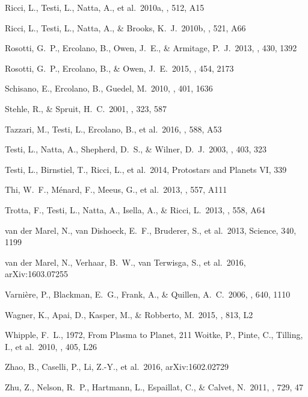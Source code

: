 \begin{thebibliography}{2000b}
 Ricci, L., Testi,
  L., Natta, A., et al.\ 2010a, \aap, 512, A15

 Ricci, L., Testi,
  L., Natta, A., \& Brooks, K.~J.\ 2010b, \aap, 521, A66 

 Rosotti, G.~P., 
Ercolano, B., Owen, J.~E., \& Armitage, P.~J.\ 2013, \mnras, 430, 1392 

 Rosotti, G.~P., Ercolano, B., \& Owen, J.~E.\ 2015, \mnras, 454, 2173

 Schisano, E., 
Ercolano, B., Guedel, M.\ 2010, \mnras, 401, 1636 

 Stehle, R., \& Spruit, H.~C.\ 2001, \mnras, 323, 587 

 Tazzari, M., Testi, L., Ercolano, B., et al.\ 2016, \aap, 588, A53 

 Testi, L., Natta,
  A., Shepherd, D.~S., \& Wilner, D.~J.\ 2003, \aap, 403, 323

 Testi, L., Birnstiel, T., 
Ricci, L., et al.\ 2014, Protostars and Planets VI, 339 

 Thi, W.~F., M{\'e}nard, F., Meeus, G., et al.\ 2013, \aap, 557, A111 

 Trotta, F., Testi, L., Natta, A., Isella, A., \& Ricci, L.\ 2013, \aap, 558, A64

 van der Marel, 
N., van Dishoeck, E.~F., Bruderer, S., et al.\ 2013, Science, 340,
1199 

 van der Marel, N., Verhaar, B.~W., van Terwisga, S., et al.\ 2016, arXiv:1603.07255

 Varni{\`e}re, P., 
Blackman, E.~G., Frank, A., \& Quillen, A.~C.\ 2006, \apj, 640, 1110 

 Wagner, K., Apai, D., Kasper, M., \& Robberto, M.\ 2015, \apjl, 813, L2

 Whipple, F.~L., 1972, From Plasma to Planet, 211
 Woitke, P., Pinte, C., 
Tilling, I., et al.\ 2010, \mnras, 405, L26 

 Zhao, B., Caselli, P., Li, Z.-Y., et al.\ 2016, arXiv:1602.02729

 Zhu, Z., Nelson, R.~P., 
Hartmann, L., Espaillat, C., \& Calvet, N.\ 2011, \apj, 729, 47 

\end{thebibliography}
